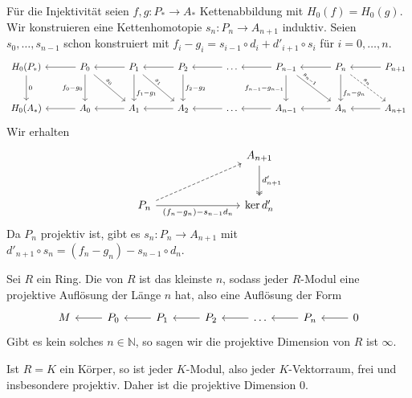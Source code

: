 \begin{beweis}
	Für die Injektivität seien $f,g \colon P_* \to A_*$ Kettenabbildung mit $H_0(f) = H_0(g)$. 
	Wir konstruieren eine Kettenhomotopie $s_n \colon P_n \to A_{n+1}$ induktiv. Seien $s_0, \ldots ,s_{n-1}$ schon konstruiert mit $f_i -g_i= s_{i-1} \circ d_i + d'_{i+1} \circ s_i$ für $i=0, \ldots , n$.
	\[
		\begin{tikzcd}[row sep=large, column sep=3.15em]
			H_0(P_*) \dar["0"] & P_0 \lar \dar["f_0-g_0"'] \drar[sloped,pos=.4,"s_0"] & P_1 \lar \dar[pos=.7,"f_1-g_1"] \drar[sloped,pos=.4,"s_1"] & P_2 \lar \dar["f_2 - g_2"] & \ldots \lar & P_{n-1} \lar\dar["f_{n-1}- g_{n-1}"'] \drar[sloped,pos=.3,"s_{n-1}"] & P_n \lar \dar[pos=.7,"f_n - g_n"]  \drar[dashed,sloped,pos=.4,"s_n"] & P_{n+1} \lar \\
			H_0(A_*) & A_0 \lar & A_1 \lar & A_2 \lar & \ldots \lar & A_{n-1} \lar & A_n \lar & A_{n+1} \lar 
		\end{tikzcd}
	\]
	Wir erhalten
	\[
		\begin{tikzcd}[row sep=large, column sep=7.5em]
			\mbox{} &  A_{n+1} \dar["d_{n+1}'",two heads] \\
			P_n \rar["(f_n-g_n)- s_{n-1} d_n"'] \urar[dashed] &\ker d_n'
		\end{tikzcd}
	\]
	Da $P_n$ projektiv ist, gibt es $s_n \colon P_n \to A_{n+1}$ mit $d'_{n+1} \circ s_n = (f_n -g_n) - s_{n-1} \circ d_n$.
\end{beweis}

\begin{definition}[{name=[projektive Dimension]}]
	Sei $R$ ein Ring.
	Die  von $R$ ist das kleinste $n$, sodass jeder $R$-Modul eine projektive Auflösung der Länge $n$ hat, also eine Auflösung der Form
	\[
		\begin{tikzcd}
			M & P_0 \lar & P_1 \lar & P_2 \lar & \ldots \lar & P_n \lar & 0 \lar
		\end{tikzcd}
	\] 
	Gibt es kein solches $n \in \mathbb{N}$, so sagen wir die projektive Dimension von $R$ ist $\infty$.
\end{definition}

\begin{beispiel}[{name=[Körper haben projektive Dimension $0$]},label=bsp:koerper_proj_dim]
	Ist $R=K$ ein Körper, so ist jeder $K$-Modul, also jeder $K$-Vektorraum, frei und insbesondere projektiv.
	Daher ist die projektive Dimension $0$.
\end{beispiel}

